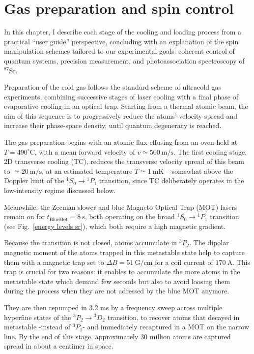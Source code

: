 \begin{flushright}
\end{flushright}\chapter{Gas preparation and spin control}

In this chapter, I describe each stage of the cooling and loading process from a
practical ``user guide'' perspective, concluding with an explanation of the spin
manipulation schemes tailored to our experimental goals: coherent control of quantum
systems, precision measurement, and photoassociation spectroscopy of $^{87}\text{Sr}$.


Preparation of the cold gas follows the standard scheme of ultracold gas experiments,
combining successive stages of laser cooling with a final phase of evaporative cooling
in an optical trap. Starting from a thermal atomic beam, the aim of this sequence is to
progressively reduce the atoms' velocity spread and increase their phase-space density,
until quantum degeneracy is reached.

The gas preparation begins with an atomic flux effusing from an oven held at
$T=490^\circ\text{C}$, with a mean forward velocity of $v \simeq 500~\text{m/s}$. The
first cooling stage, 2D transverse cooling (TC), reduces the transverse velocity spread
of this beam to $\simeq 20~\text{m/s}$, at an estimated temperature
$T \simeq 1~\text{mK}$ -- somewhat above the Doppler limit of the
$^1S_0 \rightarrow {}^1P_1$ transition, since TC deliberately operates in the
low-intensity regime discussed below.

Meanwhile, the Zeeman slower and blue Magneto-Optical Trap (MOT) lasers remain on for
$t_{\text{BlueMot}} = 8~\text{s}$, both operating on the broad
$^1S_0 \rightarrow {}^1P_1$ transition (see Fig.~\ref{energy levels sr}), which both
require a high magnetic gradient.

Because the transition is not closed, atoms accumulate in $^3P_2$. The dipolar magnetic moment
of the atoms trapped in this metastable state help to capture them with a magnetic trap set to $\Delta B = 51~\text{G/cm}$ for a coil current
of $170~\text{A}$. This trap is crucial for two reasons: it enables to accumulate the more atoms in the metastable 
state which demand few seconds but also to avoid loosing them during the process when they are not adressed by the blue 
MOT anymore.

They are then repumped in 3.2 ms by a frequency sweep across multiple hyperfine states of the
$^3P_2 \rightarrow {}^3D_2$ transition, to recover atoms that decayed
in metastable -instead of $^3P_1$- and immediately recaptured in a MOT on the narrow line. 
By the end of this stage, approximately $30$ million atoms are
captured spread in about a centimer in space.


